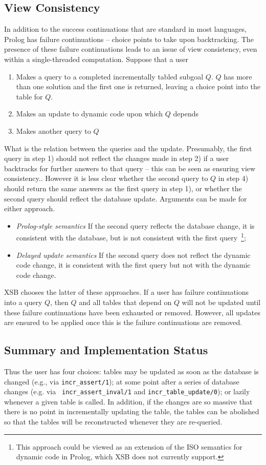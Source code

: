 \subsection{View Consistency} \label{sec:view-consistency}
%
In addition to the success continuations that are standard in most
languages, Prolog has failure continuations -- choice points to take
upon backtracking.  The presence of these failure continuations leads
to an issue of view consistency, even within a single-threaded
computation.  Suppose that a user
%
\begin{enumerate}
\item Makes a query to a completed incrementally tabled subgoal $Q$.
  $Q$ has more than one solution and the first one is returned,
  leaving a choice point into the table for $Q$.
\item Makes an update to dynamic code upon which $Q$ depends
\item Makes another query to $Q$
\end{enumerate}
%
What is the relation between the queries and the update.  Presumably,
the first query in step 1) should not reflect the changes made in step
2) if a user backtracks for further answers to that query -- this can
be seen as ensuring view consistency.. However it is less clear
whether the second query to $Q$ in step 4) should return the same
answers as the first query in step 1), or whether the second query
should reflect the database update.  Arguments can be made for either
approach.
%
\begin{itemize}
\item {\em Prolog-style semantics} If the second query reflects the
  database change, it is consistent with the database, but is not
  consistent with the first query~\footnote{This approach could be
    viewed as an extension of the ISO semantics for dynamic code in
    Prolog, which XSB does not currently support.};
\item {\em Delayed update semantics} If the second query does not
  reflect the dynamic code change, it is consistent with the first
  query but not with the dynamic code change.
\end{itemize}
%
XSB chooses the latter of these approaches.  If a user has failure
continuations into a query $Q$, then $Q$ and all tables that depend on
$Q$ will not be updated until these failure continuations have been
exhausted or removed.  However, all updates are ensured to be applied
once this is the failure continuations are removed.

\subsection{Summary and Implementation Status}
%
Thus the user has four choices: tables may be updated as soon as the
database is changed (e.g., via {\tt incr\_assert/1}); at some point
after a series of database changes (e.g. via {\tt
  incr\_assert\_inval/1} and {\tt incr\_table\_update/0}); or lazily
whenever a given table is called.  In addition, if the changes are so
massive that there is no point in incrementally updating the table,
the tables can be abolished so that the tables will be reconstructed
whenever they are re-queried.


